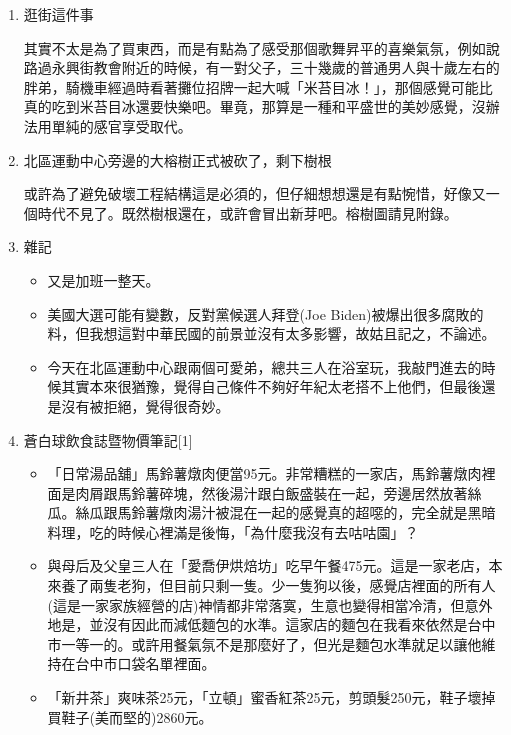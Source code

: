 \documentclass[a5paper, 11pt
]{book}
\providecommand{\tightlist}{%
  \setlength{\itemsep}{0pt}\setlength{\parskip}{0pt}}
\begin{document}
\begin{enumerate}
\def\labelenumi{\arabic{enumi}.}
\item
  逛街這件事

  其實不太是為了買東西，而是有點為了感受那個歌舞昇平的喜樂氣氛，例如說路過永興街教會附近的時候，有一對父子，三十幾歲的普通男人與十歲左右的胖弟，騎機車經過時看著攤位招牌一起大喊「米苔目冰！」，那個感覺可能比真的吃到米苔目冰還要快樂吧。畢竟，那算是一種和平盛世的美妙感覺，沒辦法用單純的感官享受取代。
\item
  北區運動中心旁邊的大榕樹正式被砍了，剩下樹根

  或許為了避免破壞工程結構這是必須的，但仔細想想還是有點惋惜，好像又一個時代不見了。既然樹根還在，或許會冒出新芽吧。榕樹圖請見附錄。
\item
  雜記

  \begin{itemize}
  \tightlist
  \item
    又是加班一整天。
  \item
    美國大選可能有變數，反對黨候選人拜登(Joe
    Biden)被爆出很多腐敗的料，但我想這對中華民國的前景並沒有太多影響，故姑且記之，不論述。
  \item
    今天在北區運動中心跟兩個可愛弟，總共三人在浴室玩，我敲門進去的時候其實本來很猶豫，覺得自己條件不夠好年紀太老搭不上他們，但最後還是沒有被拒絕，覺得很奇妙。
  \end{itemize}
\item
  蒼白球飲食誌暨物價筆記{[}1{]}

  \begin{itemize}
  \tightlist
  \item
    「日常湯品舖」馬鈴薯燉肉便當95元。非常糟糕的一家店，馬鈴薯燉肉裡面是肉屑跟馬鈴薯碎塊，然後湯汁跟白飯盛裝在一起，旁邊居然放著絲瓜。絲瓜跟馬鈴薯燉肉湯汁被混在一起的感覺真的超噁的，完全就是黑暗料理，吃的時候心裡滿是後悔，「為什麼我沒有去咕咕園」？
  \item
    與母后及父皇三人在「愛喬伊烘焙坊」吃早午餐475元。這是一家老店，本來養了兩隻老狗，但目前只剩一隻。少一隻狗以後，感覺店裡面的所有人(這是一家家族經營的店)神情都非常落寞，生意也變得相當冷清，但意外地是，並沒有因此而減低麵包的水準。這家店的麵包在我看來依然是台中市一等一的。或許用餐氣氛不是那麼好了，但光是麵包水準就足以讓他維持在台中市口袋名單裡面。
  \item
    「新井茶」爽味茶25元，「立頓」蜜香紅茶25元，剪頭髮250元，鞋子壞掉買鞋子(美而堅的)2860元。
  \end{itemize}
\end{enumerate}
\end{document}
